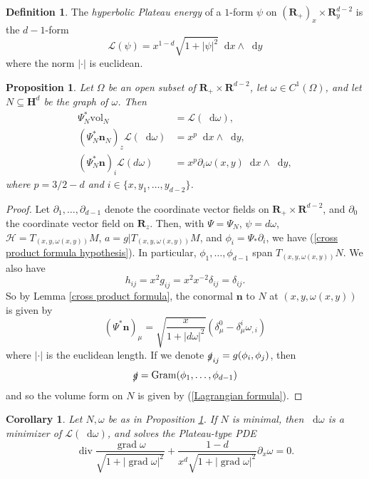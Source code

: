 \documentclass[reqno,12pt,letterpaper]{amsart}
\newcommand{\RR}{\mathbf{R}}
\newcommand{\Hyp}{\mathbf H}
\newcommand*\dif{\mathop{}\!\mathrm{d}}
\DeclareMathOperator{\Div}{div}
\DeclareMathOperator{\Gram}{Gram}
\DeclareMathOperator{\grad}{grad}
\newcommand{\Lagrange}{\mathscr L}
\newcommand{\Hilb}{\mathcal H}
\newcommand{\normal}{\mathbf n}
\newcommand{\vol}{\mathrm{vol}}
\newcommand{\dfn}[1]{\emph{#1}\index{#1}}
\newtheorem{proposition}[theorem]{Proposition}
\newtheorem{corollary}[theorem]{Corollary}
\theoremstyle{definition}
\newtheorem{definition}[theorem]{Definition}
\numberwithin{equation}{section}
\begin{document}
\begin{definition}
    The \dfn{hyperbolic Plateau energy} of a $1$-form $\psi$ on $(\RR_+)_x \times \RR^{d - 2}_y$ is the $d-1$-form
    $$\Lagrange(\psi) = x^{1 - d} \sqrt{1 + |\psi|^2} \dif x \wedge \dif y$$
    where the norm $|\cdot|$ is euclidean.
\end{definition}

\begin{proposition}\label{Lagrangian formulae}
Let $\Omega$ be an open subset of $\RR_+ \times \RR^{d - 2}$, let $\omega \in C^1(\Omega)$, and let $N \subseteq \Hyp^d$ be the graph of $\omega$. Then 
\begin{align}
    \Psi_N^* \vol_N &= \Lagrange(\dif \omega), \label{Lagrangian formula}\\
    (\Psi^*_N \normal_N)_z \Lagrange(\dif \omega) &= x^p \dif x \wedge \dif y, \label{Lagrangian normal z}\\
    (\Psi^*_N \normal)_i \Lagrange(d\omega) &= x^p \partial_i \omega(x, y) \dif x \wedge \dif y, \label{Lagrangian normal xy}
\end{align}
where $p = 3/2 - d$ and $i \in \{x, y_1, \dots, y_{d - 2}\}$.
\end{proposition}
\begin{proof}
Let $\partial_1, \dots, \partial_{d - 1}$ denote the coordinate vector fields on $\RR_+ \times \RR^{d - 2}$, and $\partial_0$ the coordinate vector field on $\RR_z$.
Then, with $\Psi = \Psi_N$, $\psi = d\omega$, $\Hilb = T_{(x, y, \omega(x, y))} M$, $a = g|T_{(x, y, \omega(x, y))} M$, and $\phi_i = \Psi_* \partial_i$, we have (\ref{cross product formula hypothesis}).
In particular, $\phi_1, \dots, \phi_{d - 1}$ span $T_{(x, y, \omega(x, y))}N$.
We also have
$$h_{ij} = x^2 g_{ij} = x^2 x^{-2} \delta_{ij} = \delta_{ij}.$$
So by Lemma \ref{cross product formula}, the conormal $\normal$ to $N$ at $(x, y, \omega(x, y))$ is given by
$$(\Psi^* \normal)_\mu = \sqrt{\frac{x}{1 + |d\omega|^2}} (\delta_\mu^0 - \delta_\mu^i \omega_{,i})$$
where $|\cdot|$ is the euclidean length.
If we denote $\slashed g_{ij} = g(\phi_i, \phi_j)$, then
$$\slashed g = \Gram(\phi_1, \dots, \phi_{d - 1})$$
and so the volume form on $N$ is given by (\ref{Lagrangian formula}).
\end{proof}

\begin{corollary}
Let $N, \omega$ be as in Proposition \ref{Lagrangian formulae}.
If $N$ is minimal, then $\dif \omega$ is a minimizer of $\Lagrange(\dif \omega)$, and solves the Plateau-type PDE
\begin{equation}\label{Plateau PDE}
    \Div \frac{\grad \omega}{\sqrt{1 + |\grad \omega|^2}} + \frac{1 - d}{x^d \sqrt{1 + |\grad \omega|^2}} \partial_x \omega = 0.
\end{equation}
\end{corollary}
\end{document}
